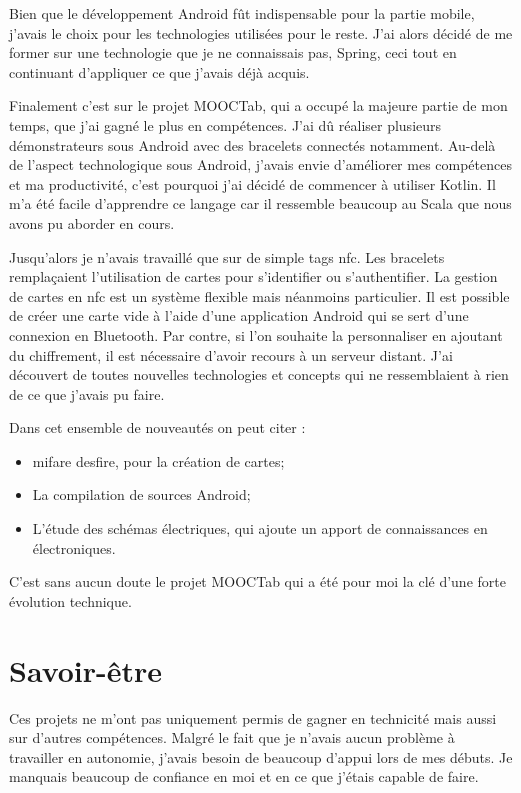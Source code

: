 \documentclass[french,12pt,a4paper,titlepage,openright,openbib]{report}
\begin{document}
Bien que le développement Android fût indispensable pour la partie mobile, j'avais le choix pour les technologies utilisées pour le reste. J'ai alors décidé de me former sur une technologie que je ne connaissais pas, Spring, ceci tout en continuant d'appliquer ce que j'avais déjà acquis.

Finalement c'est sur le projet MOOCTab, qui a occupé la majeure partie de mon temps, que j'ai gagné le plus en compétences. J'ai dû réaliser plusieurs démonstrateurs sous Android avec des bracelets connectés notamment.
Au-delà de l'aspect technologique sous Android, j'avais envie d'améliorer mes compétences et ma productivité, c'est pourquoi j'ai décidé de commencer à utiliser Kotlin. Il m'a été facile d'apprendre ce langage car il ressemble beaucoup au Scala que nous avons pu aborder en cours. 

Jusqu'alors je n'avais travaillé que sur de simple tags \gls{nfc}. Les bracelets remplaçaient l'utilisation de cartes pour s'identifier ou s'authentifier.
La gestion de cartes en \gls{nfc} est un système flexible mais néanmoins particulier. Il est possible de créer une carte vide à l'aide d'une application Android qui se sert d'une connexion en Bluetooth. Par contre, si l'on souhaite la personnaliser en ajoutant du chiffrement, il est nécessaire d'avoir recours à un serveur distant.
J'ai découvert de toutes nouvelles technologies et concepts qui ne ressemblaient à rien de ce que j'avais pu faire.
\par
Dans cet ensemble de nouveautés on peut citer :
\begin{itemize}
\item \gls{mifare} \gls{desfire}, pour la création de cartes;
\item La compilation de sources Android;
\item L'étude des schémas électriques, qui ajoute un apport de connaissances en électroniques.
\end{itemize}

\par

C'est sans aucun doute le projet MOOCTab qui a été pour moi la clé d'une forte évolution technique.
\section{Savoir-être}
Ces projets ne m'ont pas uniquement permis de gagner en technicité mais aussi sur d'autres compétences.
Malgré le fait que je n'avais aucun problème à travailler en autonomie, j'avais besoin de beaucoup d'appui lors de mes débuts. Je manquais beaucoup de confiance en moi et en ce que j'étais capable de faire.
\end{document}
